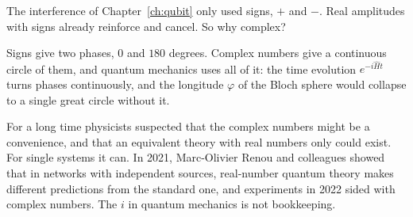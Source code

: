 The interference of Chapter~\ref{ch:qubit} only used signs, $+$ and $-$. Real
amplitudes with signs already reinforce and cancel. So why complex?

Signs give two phases, $0$ and $180$ degrees. Complex numbers give a continuous
circle of them, and quantum mechanics uses all of it: the time evolution
$e^{-i\hat Ht}$ turns phases continuously, and the longitude $\varphi$ of the Bloch
sphere would collapse to a single great circle without it.

For a long time physicists suspected that the complex numbers might be a
convenience, and that an equivalent theory with real numbers only could exist.
For single systems it can. In 2021, Marc-Olivier Renou and colleagues showed that
in networks with independent sources, real-number quantum theory makes different
predictions from the standard one, and experiments in 2022 sided with complex
numbers. The $i$ in quantum mechanics is not bookkeeping.
